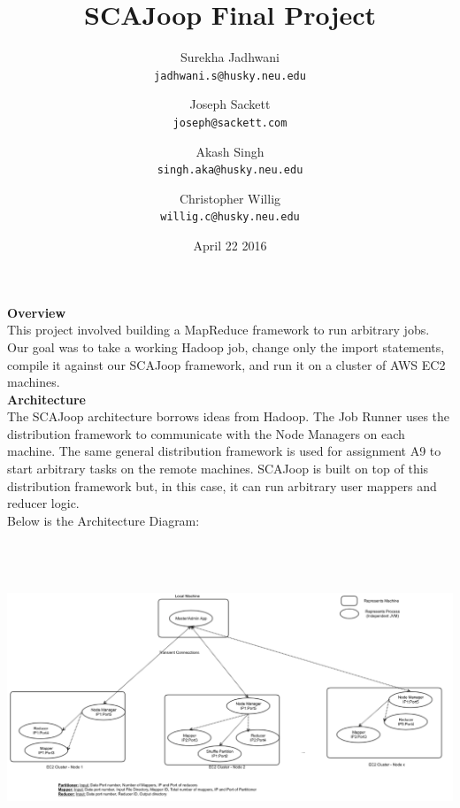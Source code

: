 \documentclass{article}
\title{SCAJoop Final Project}
\author{
	Surekha Jadhwani\\
	\texttt{jadhwani.s@husky.neu.edu}
	\and 
	Joseph Sackett\\
	\texttt{joseph@sackett.com}
	\and 
	Akash Singh\\
	\texttt{singh.aka@husky.neu.edu}
	\and
	Christopher Willig\\
	\texttt{willig.c@husky.neu.edu}
}
\date{April 22 2016}
\begin{document}
 \maketitle
\textbf{Overview} \\ 
This project involved building a MapReduce framework to run arbitrary jobs. Our goal was to take a working Hadoop job, change only the import statements, compile it against our SCAJoop framework, and run it on a cluster of AWS EC2 machines.\\

\textbf{Architecture} \\
The SCAJoop architecture borrows ideas from Hadoop. The Job Runner uses the distribution framework to communicate with the Node Managers on each machine. The same general distribution framework is used for assignment A9 to start arbitrary tasks on the remote machines. SCAJoop is built on top of this distribution framework but, in this case, it can run arbitrary user mappers and reducer logic.\\
Below is the Architecture Diagram:\\

\includegraphics[width=16.5cm,height=10cm]{SCAJoopArch.png}
\bigskip
\end{document}
